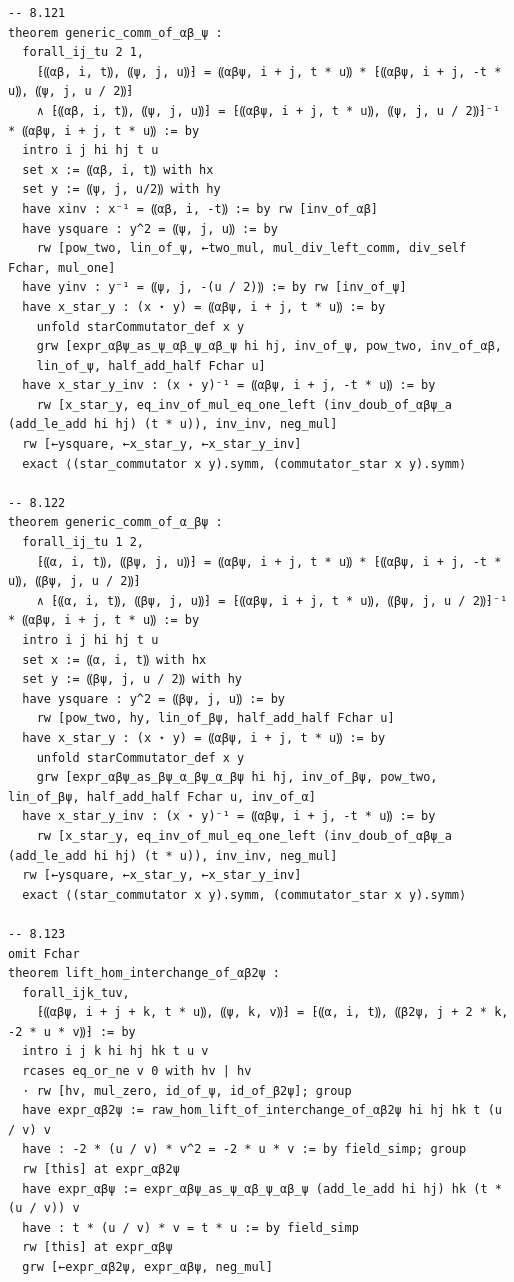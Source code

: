 \begin{Verbatim}
-- 8.121
theorem generic_comm_of_αβ_ψ :
  forall_ij_tu 2 1,
    ⁅⸨αβ, i, t⸩, ⸨ψ, j, u⸩⁆ = ⸨αβψ, i + j, t * u⸩ * ⁅⸨αβψ, i + j, -t * u⸩, ⸨ψ, j, u / 2⸩⁆
    ∧ ⁅⸨αβ, i, t⸩, ⸨ψ, j, u⸩⁆ = ⁅⸨αβψ, i + j, t * u⸩, ⸨ψ, j, u / 2⸩⁆⁻¹ * ⸨αβψ, i + j, t * u⸩ := by
  intro i j hi hj t u
  set x := ⸨αβ, i, t⸩ with hx
  set y := ⸨ψ, j, u/2⸩ with hy
  have xinv : x⁻¹ = ⸨αβ, i, -t⸩ := by rw [inv_of_αβ]
  have ysquare : y^2 = ⸨ψ, j, u⸩ := by
    rw [pow_two, lin_of_ψ, ←two_mul, mul_div_left_comm, div_self Fchar, mul_one]
  have yinv : y⁻¹ = ⸨ψ, j, -(u / 2)⸩ := by rw [inv_of_ψ]
  have x_star_y : (x ⋆ y) = ⸨αβψ, i + j, t * u⸩ := by
    unfold starCommutator_def x y
    grw [expr_αβψ_as_ψ_αβ_ψ_αβ_ψ hi hj, inv_of_ψ, pow_two, inv_of_αβ,
    lin_of_ψ, half_add_half Fchar u]
  have x_star_y_inv : (x ⋆ y)⁻¹ = ⸨αβψ, i + j, -t * u⸩ := by
    rw [x_star_y, eq_inv_of_mul_eq_one_left (inv_doub_of_αβψ_a (add_le_add hi hj) (t * u)), inv_inv, neg_mul]
  rw [←ysquare, ←x_star_y, ←x_star_y_inv]
  exact ⟨(star_commutator x y).symm, (commutator_star x y).symm⟩

-- 8.122
theorem generic_comm_of_α_βψ :
  forall_ij_tu 1 2,
    ⁅⸨α, i, t⸩, ⸨βψ, j, u⸩⁆ = ⸨αβψ, i + j, t * u⸩ * ⁅⸨αβψ, i + j, -t * u⸩, ⸨βψ, j, u / 2⸩⁆
    ∧ ⁅⸨α, i, t⸩, ⸨βψ, j, u⸩⁆ = ⁅⸨αβψ, i + j, t * u⸩, ⸨βψ, j, u / 2⸩⁆⁻¹ * ⸨αβψ, i + j, t * u⸩ := by
  intro i j hi hj t u
  set x := ⸨α, i, t⸩ with hx
  set y := ⸨βψ, j, u / 2⸩ with hy
  have ysquare : y^2 = ⸨βψ, j, u⸩ := by
    rw [pow_two, hy, lin_of_βψ, half_add_half Fchar u]
  have x_star_y : (x ⋆ y) = ⸨αβψ, i + j, t * u⸩ := by
    unfold starCommutator_def x y
    grw [expr_αβψ_as_βψ_α_βψ_α_βψ hi hj, inv_of_βψ, pow_two, lin_of_βψ, half_add_half Fchar u, inv_of_α]
  have x_star_y_inv : (x ⋆ y)⁻¹ = ⸨αβψ, i + j, -t * u⸩ := by
    rw [x_star_y, eq_inv_of_mul_eq_one_left (inv_doub_of_αβψ_a (add_le_add hi hj) (t * u)), inv_inv, neg_mul]
  rw [←ysquare, ←x_star_y, ←x_star_y_inv]
  exact ⟨(star_commutator x y).symm, (commutator_star x y).symm⟩

-- 8.123
omit Fchar
theorem lift_hom_interchange_of_αβ2ψ :
  forall_ijk_tuv,
    ⁅⸨αβψ, i + j + k, t * u⸩, ⸨ψ, k, v⸩⁆ = ⁅⸨α, i, t⸩, ⸨β2ψ, j + 2 * k, -2 * u * v⸩⁆ := by
  intro i j k hi hj hk t u v
  rcases eq_or_ne v 0 with hv | hv
  · rw [hv, mul_zero, id_of_ψ, id_of_β2ψ]; group
  have expr_αβ2ψ := raw_hom_lift_of_interchange_of_αβ2ψ hi hj hk t (u / v) v
  have : -2 * (u / v) * v^2 = -2 * u * v := by field_simp; group
  rw [this] at expr_αβ2ψ
  have expr_αβψ := expr_αβψ_as_ψ_αβ_ψ_αβ_ψ (add_le_add hi hj) hk (t * (u / v)) v
  have : t * (u / v) * v = t * u := by field_simp
  rw [this] at expr_αβψ
  grw [←expr_αβ2ψ, expr_αβψ, neg_mul]



\end{Verbatim}
